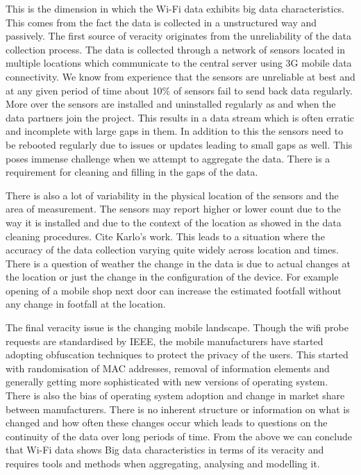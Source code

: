 This is the dimension in which the Wi-Fi data exhibits big data characteristics.
This comes from the fact the data is collected in a unstructured way and passively.
The first source of veracity originates from the unreliability of the data collection process.
The data is collected through a network of sensors located in multiple locations which communicate to the central server using 3G mobile data connectivity.
We know from experience that the sensors are unreliable at best and at any given period of time about 10\% of sensors fail to send back data regularly.
More over the sensors are installed and uninstalled regularly as and when the data partners join the project.
This results in a data stream which is often erratic and incomplete with large gaps in them.
In addition to this the sensors need to be rebooted regularly due to issues or updates leading to small gaps as well.
This poses immense challenge when we attempt to aggregate the data.
There is a requirement for cleaning and filling in the gaps of the data.

There is also a lot of variability in the physical location of the sensors and the area of measurement.
The sensors may report higher or lower count due to the way it is installed and due to the context of the location as showed in the data cleaning procedures.
Cite Karlo's work.
This leads to a situation where the accuracy of the data collection varying quite widely across location and times.
There is a question of weather the change in the data is due to actual changes at the location or just the change in the configuration of the device.
For example opening of a mobile shop next door can increase the estimated footfall without any change in footfall at the location.

The final veracity issue is the changing mobile landscape.
Though the wifi probe requests are standardised by IEEE, the mobile manufacturers have started adopting obfuscation techniques to protect the privacy of the users.
This started with randomisation of MAC addresses, removal of information elements and generally getting more sophisticated with new versions of operating system.
There is also the bias of operating system adoption and change in market share between manufacturers.
There is no inherent structure or information on what is changed and how often these changes occur which leads to questions on the continuity of the data over long periods of time.
From the above we can conclude that Wi-Fi data shows Big data characteristics in terms of its veracity and requires tools and methods when aggregating, analysing and modelling it.


